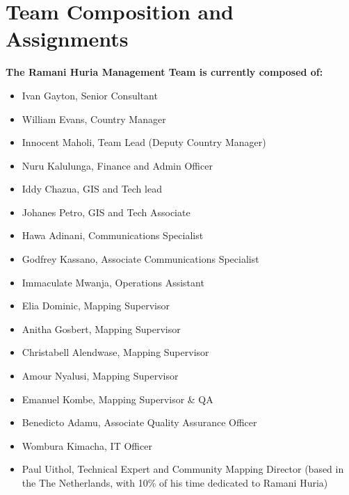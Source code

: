 \documentclass[a4paper,12pt,twoside]{article}
\begin{document}
\newpage
\section{Team Composition and Assignments}

\textbf{The Ramani Huria Management Team is currently composed of:}

\begin{itemize}
     
 \item Ivan Gayton, Senior Consultant
 \item William Evans, Country Manager
 \item Innocent Maholi, Team Lead (Deputy Country Manager)
 \item Nuru Kalulunga, Finance and Admin Officer
 \item Iddy Chazua, GIS and Tech lead
 \item Johanes Petro, GIS and Tech Associate
 \item Hawa Adinani, Communications Specialist
 \item Godfrey Kassano, Associate Communications Specialist
 \item Immaculate Mwanja, Operations Assistant
 \item Elia Dominic, Mapping Supervisor
 \item Anitha Gosbert, Mapping Supervisor
 \item Christabell Alendwase, Mapping Supervisor
 \item Amour Nyalusi, Mapping Supervisor
 \item Emanuel Kombe, Mapping Supervisor \& QA
 \item Benedicto Adamu, Associate Quality Assurance Officer
 \item Wombura Kimacha, IT Officer
 \item Paul Uithol, Technical Expert and Community Mapping Director (based in the
The Netherlands, with 10\% of his time dedicated to Ramani Huria)
\end{itemize}

\newpage
\end{document}
